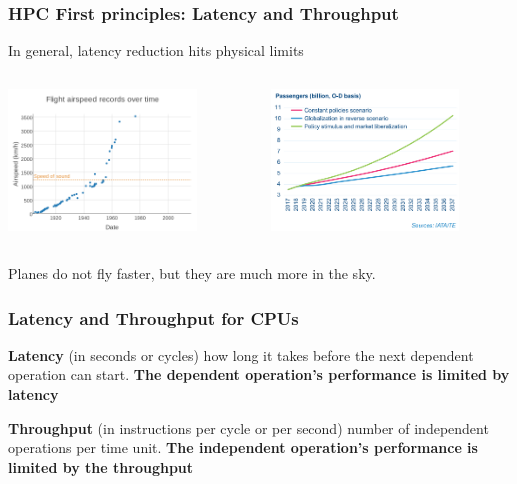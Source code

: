 \begin{frame}[containsverbatim]
\frametitle{HPC First principles: Latency and Throughput}
In general, latency reduction hits physical limits
\vfill

\begin{columns}[c]
	\begin{column}{5cm}
	\includegraphics[width=5cm]{DayGilles/images/airspeed.png}
	\end{column} 
	\begin{column}{5cm}
	\includegraphics[width=5cm]{DayGilles/images/airtravel.png}
	\end{column}
\end{columns} 
\vfill
Planes do not fly faster, but they are much more in the sky.
\end{frame}



\begin{frame}[containsverbatim]
\frametitle{Latency and Throughput for CPUs}

\begin{alertblock}{\textbf{Latency} (in seconds or cycles)}
how long it takes before the next dependent operation can start. \textbf{The dependent operation's performance is limited by latency}
\end{alertblock}
\vfill

\begin{alertblock}{\textbf{Throughput} (in instructions per cycle or per second)}
number of independent operations per time unit. \textbf{The independent operation's performance is limited by the throughput}
\end{alertblock}

\end{frame}



